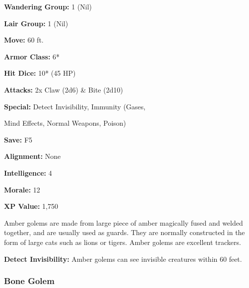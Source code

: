 \begin{multicols*}{2}
{\textbf{Wandering Group:} 1 (Nil)

\textbf{Lair Group:} 1 (Nil)

\textbf{Move:} 60 ft.

\textbf{Armor Class:} 6*

\textbf{Hit Dice:} 10* (45 HP)

\textbf{Attacks:} 2x Claw (2d6) \& Bite (2d10)

\textbf{Special:} Detect Invisibility, Immunity (Gases, 

Mind Effects, Normal Weapons, Poison)

\textbf{Save:} F5

\textbf{Alignment:} None

\textbf{Intelligence:} 4

\textbf{Morale:} 12

\textbf{XP Value:} 1,750}

Amber golems are made from large piece of amber magically fused and welded together, and are usually used as guards. They are normally constructed in the form of large cats such as lions or tigers. Amber golems are excellent trackers.

\textbf{Detect Invisibility:} Amber golems can see invisible creatures within 60 feet.

\subsubsection{Bone Golem}
\end{multicols*}
